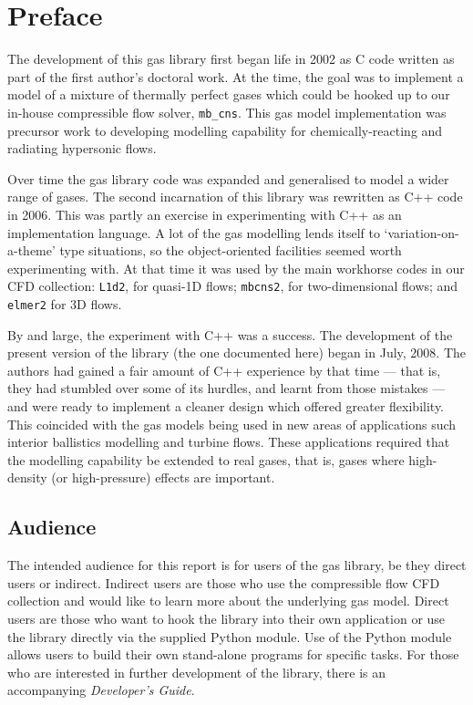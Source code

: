 \chapter*{Preface}

The development of this gas library first began life in 2002
as C code written as part of the first author's doctoral work.
At the time, the goal was to implement a model of a mixture
of thermally perfect gases which could be hooked up to
our in-house compressible flow solver, \texttt{mb\_cns}.
This gas model implementation was precursor work to
developing modelling capability for chemically-reacting
and radiating hypersonic flows.

Over time the gas library code was expanded and generalised
to model a wider range of gases.
The second incarnation of this library was rewritten as
C++ code in 2006.
This was partly an exercise in experimenting with C++
as an implementation language.
A lot of the gas modelling lends itself to `variation-on-a-theme'
type situations, so the object-oriented facilities seemed
worth experimenting with.
At that time it was used by the main workhorse codes in our
CFD collection: \texttt{L1d2}, for quasi-1D flows;
\texttt{mbcns2}, for two-dimensional flows; and \texttt{elmer2}
for 3D flows.

By and large, the experiment with C++ was a success.
The development of the present version of the library
(the one documented here) began in July, 2008.
The authors had gained a fair amount of C++ experience by that
time --- that is, they had stumbled over some of its hurdles, and learnt
from those mistakes --- and were ready to implement a cleaner design
which offered greater flexibility.
This coincided with the gas models being used in new areas of applications
such interior ballistics modelling and turbine flows.
These applications required that the modelling capability
be extended to real gases, that is, gases where high-density (or high-pressure) effects are important.

\section*{Audience}
The intended audience for this report is for users of the gas library, 
be they direct users or indirect.
Indirect users are those who use the compressible flow CFD collection
and would like to learn more about the underlying gas model.
Direct users are those who want to hook the library into their
own application or use the library directly via the supplied Python
module.
Use of the Python module allows users to build their own stand-alone
programs for specific tasks.
For those who are interested in further development of the library,
there is an accompanying \textit{Developer's Guide}.

